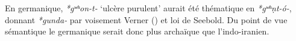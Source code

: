 \documentclass[11pt]{article}
\newcommand{\ipa}[1]{{\phon\textit{#1}}}
\begin{document}
En germanique, \ipa{*gʷʰon-t-} `ulcère purulent' aurait été thématique en \ipa{*gʷʰṇt-ó-}, donnant \ipa{*gunda-} par voisement Verner (\citealt[128]{schaffner01vernersche}) et loi de Seebold. Du point de vue sémantique le germanique serait donc plus archaïque que l'indo-iranien.








 
\end{document}
